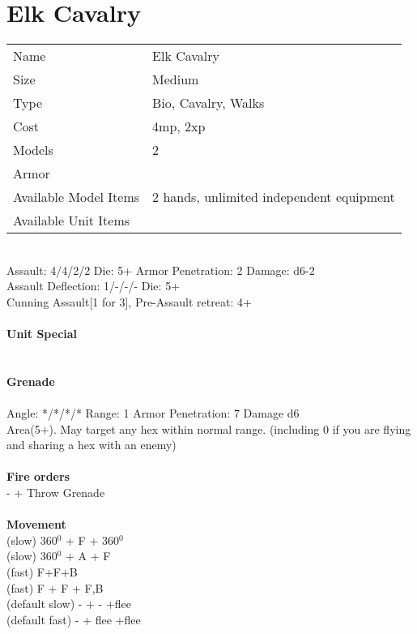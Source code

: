 \pagebreak

\section{ Elk Cavalry }

\begin{tabular}{ll}
  Name & Elk Cavalry \\
  Size & Medium\\
  Type & Bio, Cavalry, Walks\\
  Cost & 4mp, 2xp\\
  Models & 2\\
  Armor & \\
  Available Model Items & 2 hands, unlimited independent equipment \\
  Available Unit Items &  \\
\end{tabular}

\ \\
Assault: 4/4/2/2 Die: 5+ Armor Penetration: 2 Damage: d6-2 \\
Assault Deflection: 1/-/-/- Die: 5+\\
\indent Cunning Assault[1 for 3], Pre-Assault retreat: 4+ \\
\ \\

{\bf Unit Special} \\

\ \\
\ \\
{\bf Grenade } \\
\ \\
Angle: */*/*/* Range: 1 Armor Penetration: 7 Damage d6 \\
\indent Area(5+). May target any hex within normal range. (including 0 if you are flying and sharing a hex with an enemy) \\





\ \\ {\bf Fire orders } \\
- + Throw Grenade \\
\ \\ {\bf Movement } \\
(slow) 360$^0$ + F + 360$^0$ \\
(slow) 360$^0$ + A + F \\
(fast) F+F+B \\
(fast) F + F + F,B \\
(default slow) - + - +flee \\
(default fast) - + flee +flee \\



